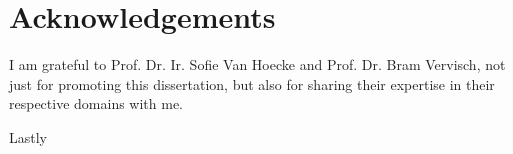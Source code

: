 \chapter{Acknowledgements}

I am grateful to Prof. Dr. Ir. Sofie Van Hoecke and Prof. Dr. Bram Vervisch, not just for promoting this dissertation, but also for sharing their expertise in their respective domains with me.

Lastly